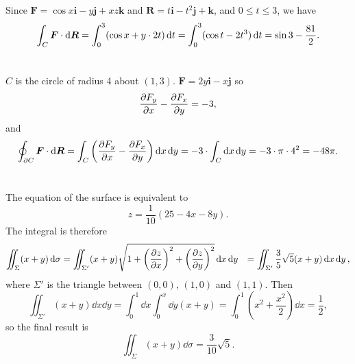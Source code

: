 \documentclass[hyperref, a4paper]{article}
\def\\{}%
\begin{document}
\section{}

Since $\mathbf{F}=\cos x \mathbf{i}-y \mathbf{j}+x z \mathbf{k}$ 
and $\mathbf{R}=t \mathbf{i}-t^2 \mathbf{j}+\mathbf{k}$,
and $0 \leq t \leq 3$, we have 
\begin{equation}
    \int_C \vb*{F} \cdot \dd{\vb*{R}}
    = \int_{0}^{3} (\cos x + y \cdot 2 t )  \dd{t}
    = \int_{0}^{3} (\cos t - 2 t^3) \dd{t}
    = \sin 3 - \frac{81}{2}.
\end{equation}

\section{}

$C$ is the circle of radius 4 about $(1, 3)$. 
$\mathbf{F}=2 y \mathbf{i}-x \mathbf{j}$ so 
\begin{equation}
    \pdv{F_y}{x} - \pdv{F_x}{y} = -3,
\end{equation}
and 
\begin{equation}
    \oint_{\partial C} \vb*{F} \cdot \dd{\vb*{R}} = \int_C \left(
        \pdv{F_y}{x} - \pdv{F_x}{y}
    \right) \dd{x} \dd{y}
    = - 3 \cdot \int_C \dd{x} \dd{y} = - 3 \cdot \pi \cdot 4^2 = - 48 \pi.
\end{equation}

\section{}

The equation of the surface is equivalent to 
\begin{equation}
    z = \frac{1}{10} (25 - 4x - 8y).
\end{equation}
The integral is therefore 
\begin{equation}
    \begin{aligned}
        \iint_\Sigma (x + y) \dd{\sigma} &= 
        \iint_{\Sigma'} (x + y) \sqrt{
            1 + \left(\pdv{z}{x}\right)^2 + \left(\pdv{z}{y}\right)^2
        } \dd{x} \dd{y} \\
        &= \iint_{\Sigma'} \frac{3}{5} \sqrt{5} (x + y) \dd{x} \dd{y},
    \end{aligned}
\end{equation}
where $\Sigma'$ is the triangle between $(0, 0)$, $(1, 0)$ and $(1, 1)$.
Then 
\begin{equation}
    \iint_{\Sigma'} (x + y) \dd{x} \dd{y}
    = \int_{0}^{1} \dd{x} \int_{0}^{x} \dd{y} (x + y)
    = \int_{0}^{1} \left(x^2 + \frac{x^2}{2}\right) \dd{x}
    = \frac{1}{2},
\end{equation}
so the final result is 
\begin{equation}
    \iint_\Sigma (x + y) \dd{\sigma} = \frac{3}{10}\sqrt{5}.
\end{equation}
\end{document}
